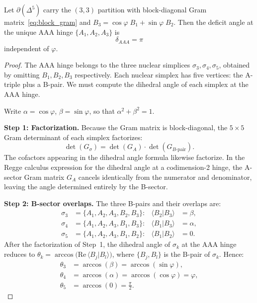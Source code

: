 \begin{theorem}\label{thm:delta_AAA}
Let $\partial(\Delta^5)$ carry the $(3,3)$ partition with
block-diagonal Gram matrix~\eqref{eq:block_gram} and
$B_3 = \cos\varphi\; B_1 + \sin\varphi\; B_2$.  Then the deficit
angle at the unique AAA hinge $\{A_1, A_2, A_3\}$ is
\begin{equation}
\boxed{\delta_{AAA} = \pi}
\end{equation}
independent of $\varphi$.
\end{theorem}

\begin{proof}
The AAA hinge belongs to the three nuclear simplices
$\sigma_3, \sigma_4, \sigma_5$, obtained by omitting $B_1, B_2, B_3$
respectively.  Each nuclear simplex has five vertices: the A-triple
plus a B-pair.  We must compute the dihedral angle of each simplex at
the AAA hinge.

Write $\alpha = \cos\varphi$, $\beta = \sin\varphi$, so that
$\alpha^2 + \beta^2 = 1$.

\medskip\noindent\textbf{Step 1: Factorization.}
Because the Gram matrix is block-diagonal, the $5\times 5$ Gram
determinant of each simplex factorizes:
\[
\det(G_\sigma) = \det(G_A) \cdot \det(G_{B\text{-pair}}).
\]
The cofactors appearing in the dihedral angle formula likewise
factorize.  In the Regge calculus expression for the dihedral angle at
a codimension-2 hinge, the A-sector Gram matrix $G_A$ cancels
identically from the numerator and denominator, leaving the angle
determined entirely by the B-sector.

\medskip\noindent\textbf{Step 2: B-sector overlaps.}
The three B-pairs and their overlaps are:
\begin{align}
\sigma_3 &= \{A_1, A_2, A_3, B_2, B_3\}:
  &\langle B_2 | B_3 \rangle &= \beta, \label{eq:overlap_23}\\
\sigma_4 &= \{A_1, A_2, A_3, B_1, B_3\}:
  &\langle B_1 | B_3 \rangle &= \alpha, \label{eq:overlap_13}\\
\sigma_5 &= \{A_1, A_2, A_3, B_1, B_2\}:
  &\langle B_1 | B_2 \rangle &= 0. \label{eq:overlap_12}
\end{align}
After the factorization of Step~1, the dihedral angle of $\sigma_k$
at the AAA hinge reduces to $\theta_k = \arccos\bigl(\text{Re}\,
\langle B_j | B_l \rangle\bigr)$, where $\{B_j, B_l\}$ is the B-pair
of $\sigma_k$.  Hence:
\begin{align}
\theta_3 &= \arccos(\beta) = \arccos(\sin\varphi), \\
\theta_4 &= \arccos(\alpha) = \arccos(\cos\varphi) = \varphi, \\
\theta_5 &= \arccos(0) = \frac{\pi}{2}.
\end{align}


\end{proof}
